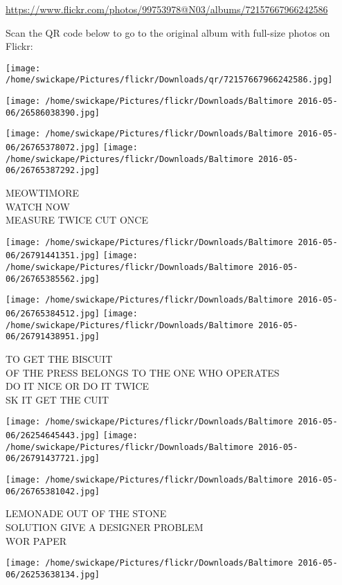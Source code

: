 \documentclass[10pt,letterpaper]{article}
\begin{document}
\url{https://www.flickr.com/photos/99753978@N03/albums/72157667966242586}

Scan the QR code below to go to the original album with full-size photos on Flickr:

\texttt{[image: /home/swickape/Pictures/flickr/Downloads/qr/72157667966242586.jpg]}
\pagebreak

\texttt{[image: /home/swickape/Pictures/flickr/Downloads/Baltimore 2016-05-06/26586038390.jpg]}

\vspace{0.25in}
\texttt{[image: /home/swickape/Pictures/flickr/Downloads/Baltimore 2016-05-06/26765378072.jpg]}
\texttt{[image: /home/swickape/Pictures/flickr/Downloads/Baltimore 2016-05-06/26765387292.jpg]}

MEOWTIMORE\\
WATCH NOW\\
MEASURE TWICE CUT ONCE
\pagebreak

\texttt{[image: /home/swickape/Pictures/flickr/Downloads/Baltimore 2016-05-06/26791441351.jpg]}
\texttt{[image: /home/swickape/Pictures/flickr/Downloads/Baltimore 2016-05-06/26765385562.jpg]}

\texttt{[image: /home/swickape/Pictures/flickr/Downloads/Baltimore 2016-05-06/26765384512.jpg]}
\texttt{[image: /home/swickape/Pictures/flickr/Downloads/Baltimore 2016-05-06/26791438951.jpg]}

TO GET THE BISCUIT\\
OF THE PRESS BELONGS TO THE ONE WHO OPERATES\\
DO IT NICE OR DO IT TWICE\\
SK IT GET THE CUIT
\pagebreak

\texttt{[image: /home/swickape/Pictures/flickr/Downloads/Baltimore 2016-05-06/26254645443.jpg]}
\texttt{[image: /home/swickape/Pictures/flickr/Downloads/Baltimore 2016-05-06/26791437721.jpg]}

\texttt{[image: /home/swickape/Pictures/flickr/Downloads/Baltimore 2016-05-06/26765381042.jpg]}

LEMONADE OUT OF THE STONE\\
SOLUTION GIVE A DESIGNER PROBLEM\\
WOR PAPER
\pagebreak

\texttt{[image: /home/swickape/Pictures/flickr/Downloads/Baltimore 2016-05-06/26253638134.jpg]}
\end{document}
